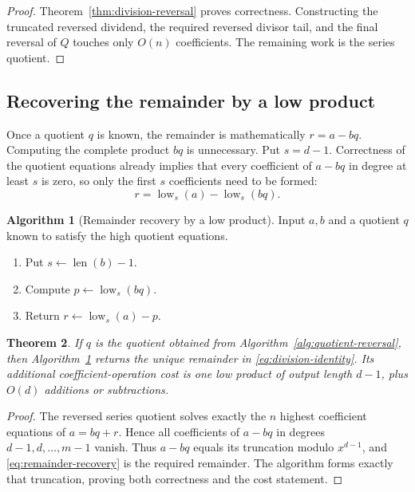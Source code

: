 \documentclass[11pt]{book}
\newtheorem{theorem}{Theorem}[section]
\theoremstyle{definition}
\newtheorem{algorithm}[theorem]{Algorithm}
\newcommand{\len}{\operatorname{len}}
\begin{document}
\begin{proof}
Theorem~\ref{thm:division-reversal} proves correctness.  Constructing the
truncated reversed dividend, the required reversed divisor tail, and the final
reversal of $Q$ touches only $O(n)$ coefficients.  The remaining work is the
series quotient.
\end{proof}

\subsection{Recovering the remainder by a low product}

Once a quotient $q$ is known, the remainder is mathematically
$r=a-bq$.  Computing the complete product $bq$ is unnecessary.  Put
$s=d-1$.  Correctness of the quotient equations already implies that every
coefficient of $a-bq$ in degree at least $s$ is zero, so only the first $s$
coefficients need to be formed:
\begin{equation}\label{eq:remainder-recovery}
 r=\operatorname{low}_{s}(a)-\operatorname{low}_{s}(bq).
\end{equation}

\begin{algorithm}[Remainder recovery by a low product]\label{alg:remainder-low-product}
Input $a,b$ and a quotient $q$ known to satisfy the high quotient equations.
\begin{enumerate}
 \item Put $s\leftarrow\len(b)-1$.
 \item Compute $p\leftarrow\operatorname{low}_{s}(bq)$.
 \item Return
 $r\leftarrow\operatorname{low}_{s}(a)-p$.
\end{enumerate}
\end{algorithm}

\begin{theorem}\label{thm:remainder-low-product}
If $q$ is the quotient obtained from
Algorithm~\ref{alg:quotient-reversal}, then
Algorithm~\ref{alg:remainder-low-product} returns the unique remainder in
\eqref{eq:division-identity}.  Its additional coefficient-operation cost is
one low product of output length $d-1$, plus $O(d)$ additions or
subtractions.
\end{theorem}

\begin{proof}
The reversed series quotient solves exactly the $n$ highest coefficient
equations of $a=bq+r$.  Hence all coefficients of $a-bq$ in degrees
$d-1,d,\ldots,m-1$ vanish.  Thus $a-bq$ equals its truncation modulo
$x^{d-1}$, and \eqref{eq:remainder-recovery} is the required remainder.  The
algorithm forms exactly that truncation, proving both correctness and the
cost statement.
\end{proof}
\end{document}
